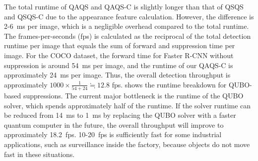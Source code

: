 The total runtime of QAQS and QAQS-C is slightly longer than that of QSQS and QSQS-C due to the appearance feature calculation. However, the difference is 2-6~ms per image, which is a negligible overhead compared to the total runtime.
The frames-per-seconds (fps) is calculated as the reciprocal of the total detection runtime per image that equals the sum of forward and suppression time per image.
For the COCO dataset, the forward time for Faster R-CNN without suppression is around 54~ms per image, and the runtime of our QAQS-C is approximately 24~ms per image. 
Thus, the overall detection throughput is approximately $1000\times\frac{1}{54+24} \fallingdotseq 12.8$ fps.
 shows the runtime breakdown for QUBO-based suppressions. The current major bottleneck is the runtime of the QUBO solver, which spends approximately half of the runtime. If the solver runtime can be reduced from 14~ms to 1~ms by replacing the QUBO solver with a faster quantum computer in the future, the overall throughput will improve to approximately 18.2~fps.
10-20~fps is sufficiently fast for some industrial applications, such as surveillance inside the factory, because objects do not move fast in these situations.

